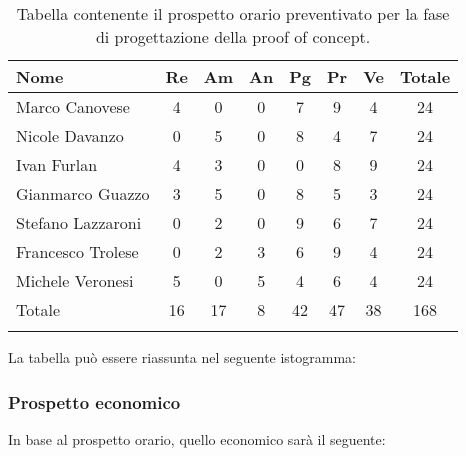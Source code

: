 			\begin{longtable}{|l|c|c|c|c|c|c|c|}
				\hline
				\rowcolor{lighter-grayer}
				\textbf{Nome} & \textbf{Re} & \textbf{Am} & \textbf{An} & \textbf{Pg}  & \textbf{Pr}   & \textbf{Ve} & \textbf{Totale} \\
				\hline
				\endfirsthead
				
				\hline
				Marco Canovese & 4& 0 & 0 & 7 & 9 & 4 & 24\\
				\hline
				\hline
				Nicole Davanzo & 0 & 5 & 0 & 8 & 4 & 7 & 24\\
				\hline
				\hline
				Ivan Furlan & 4 & 3 & 0 & 0 & 8 & 9 & 24\\
				\hline
				\hline
				Gianmarco Guazzo & 3 & 5 & 0 & 8 & 5 & 3 & 24\\
				\hline
				\hline
				Stefano Lazzaroni & 0 & 2 & 0 & 9 & 6 & 7 & 24\\
				\hline
				\hline
				Francesco Trolese & 0 & 2 & 3 & 6 & 9 & 4 & 24\\
				\hline
				\hline
				Michele Veronesi & 5 & 0 & 5 & 4 & 6 & 4 & 24\\
				\hline 
				\hline
				Totale & 16 & 17 & 8 & 42 & 47 & 38 & 168\\
				\hline 
				\caption{Tabella contenente il prospetto orario preventivato per la fase di progettazione della proof of concept.}
			\end{longtable}

		
			La tabella può essere riassunta nel seguente istogramma:
		
		
			\subsubsection{Prospetto economico}
			In base al prospetto orario, quello economico sarà il seguente: 
			
